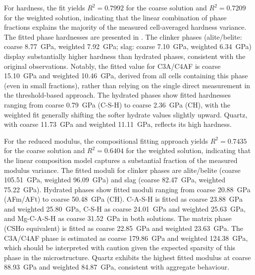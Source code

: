 For hardness, the fit yields $R^2 = 0.7992$ for the coarse solution and $R^2 = 0.7209$ for the weighted solution, indicating that the linear combination of phase fractions explains the majority of the measured cell-averaged hardness variance.
The fitted phase hardnesses are presented in .
The clinker phases (alite/belite: coarse \qty{8.77}{\giga\pascal}, weighted \qty{7.92}{\giga\pascal}; slag: coarse \qty{7.10}{\giga\pascal}, weighted \qty{6.34}{\giga\pascal}) display substantially higher hardness than hydrated phases, consistent with the original observations.
Notably, the fitted value for \acs{C3A}/\acs{C4AF} is coarse \qty{15.10}{\giga\pascal} and weighted \qty{10.46}{\giga\pascal}, derived from all cells containing this phase (even in small fractions), rather than relying on the single direct measurement in the threshold-based approach.
The hydrated phases show fitted hardnesses ranging from coarse \qty{0.79}{\giga\pascal} (C-S-H) to coarse \qty{2.36}{\giga\pascal} (CH), with the weighted fit generally shifting the softer hydrate values slightly upward.
Quartz, with coarse \qty{11.73}{\giga\pascal} and weighted \qty{11.11}{\giga\pascal}, reflects its high hardness.

For the reduced modulus, the compositional fitting approach yields $R^2 = 0.7435$ for the coarse solution and $R^2 = 0.6404$ for the weighted solution, indicating that the linear composition model captures a substantial fraction of the measured modulus variance.
The fitted moduli for clinker phases are alite/belite (coarse \qty{105.51}{\giga\pascal}, weighted \qty{96.09}{\giga\pascal}) and slag (coarse \qty{82.47}{\giga\pascal}, weighted \qty{75.22}{\giga\pascal}).
Hydrated phases show fitted moduli ranging from coarse \qty{20.88}{\giga\pascal} (AFm/AFt) to coarse \qty{50.48}{\giga\pascal} (CH).
C-A-S-H is fitted as coarse \qty{23.88}{\giga\pascal} and weighted \qty{25.80}{\giga\pascal}, C-S-H as coarse \qty{24.01}{\giga\pascal} and weighted \qty{25.63}{\giga\pascal}, and Mg-C-A-S-H as coarse \qty{31.52}{\giga\pascal} in both solutions.
The matrix phase (CSHo equivalent) is fitted as coarse \qty{22.85}{\giga\pascal} and weighted \qty{23.63}{\giga\pascal}.
The \acs{C3A}/\acs{C4AF} phase is estimated as coarse \qty{179.86}{\giga\pascal} and weighted \qty{124.38}{\giga\pascal}, which should be interpreted with caution given the expected sparsity of this phase in the microstructure.
Quartz exhibits the highest fitted modulus at coarse \qty{88.93}{\giga\pascal} and weighted \qty{84.87}{\giga\pascal}, consistent with aggregate behaviour.

